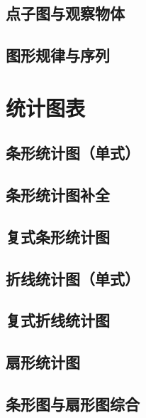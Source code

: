 \section{点子图与观察物体}


\section{图形规律与序列}


\chapter{统计图表}

\section{条形统计图（单式）}


\section{条形统计图补全}


\section{复式条形统计图}


\section{折线统计图（单式）}


\section{复式折线统计图}


\section{扇形统计图}


\section{条形图与扇形图综合}


